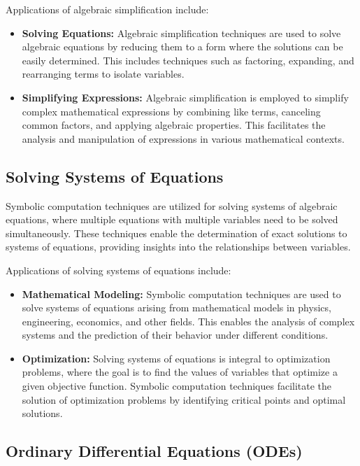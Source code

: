 Applications of algebraic simplification include:
%
\begin{itemize}
  \setlength{\itemsep}{0.0em}
  \item \textbf{Solving Equations:} Algebraic simplification techniques are used to solve algebraic equations by reducing them to a form where the solutions can be easily determined. This includes techniques such as factoring, expanding, and rearranging terms to isolate variables.
  \item \textbf{Simplifying Expressions:} Algebraic simplification is employed to simplify complex mathematical expressions by combining like terms, canceling common factors, and applying algebraic properties. This facilitates the analysis and manipulation of expressions in various mathematical contexts.
\end{itemize}

\subsection{Solving Systems of Equations}

Symbolic computation techniques are utilized for solving systems of algebraic equations, where multiple equations with multiple variables need to be solved simultaneously. These techniques enable the determination of exact solutions to systems of equations, providing insights into the relationships between variables.

Applications of solving systems of equations include:
%
\begin{itemize}
  \setlength{\itemsep}{0.0em}
  \item \textbf{Mathematical Modeling:} Symbolic computation techniques are used to solve systems of equations arising from mathematical models in physics, engineering, economics, and other fields. This enables the analysis of complex systems and the prediction of their behavior under different conditions.
  \item \textbf{Optimization:} Solving systems of equations is integral to optimization problems, where the goal is to find the values of variables that optimize a given objective function. Symbolic computation techniques facilitate the solution of optimization problems by identifying critical points and optimal solutions.
\end{itemize}

\subsection{Ordinary Differential Equations (ODEs)}

